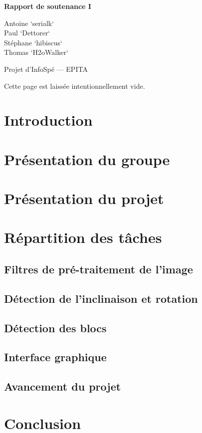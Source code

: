 \documentclass[12pt,a4paper]{article}
\newcommand{\subtitle}{Rapport de soutenance I}
\begin{document}
\begin{titlepage}
\begin{center}
\vspace{8cm}
\vspace{0.5cm}

\LARGE{\textbf{\subtitle}}
\vspace{1cm}

\large{\textsf{
Antoine `serialk`  \\
Paul `Dettorer`  \\
Stéphane `hibiscus`  \\
Thomas `H2oWalker` }}
\vspace{2cm}

\large{\textsf{Projet d'InfoSpé --- EPITA}}
\end{center}
\end{titlepage}

\newpage
Cette page est laissée intentionnellement vide.

\newpage
\setcounter{tocdepth}{3}
\tableofcontents

\newpage
\pagestyle{headings}
\section{Introduction}

\section{Présentation du groupe}


\newpage
\section{Présentation du projet}


\newpage
\section{Répartition des tâches}
\subsection{Filtres de pré-traitement de l'image}

\newpage
\subsection{Détection de l'inclinaison et rotation}

\newpage
\subsection{Détection des blocs}

\newpage
\subsection{Interface graphique}


\newpage
\subsection{Avancement du projet}


\newpage
\section{Conclusion}

\end{document}
